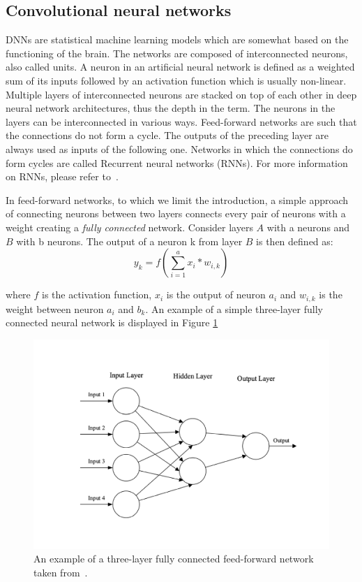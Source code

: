 \subsection{Convolutional neural networks}\label{subsec:convolutional-neural-networks}
DNNs are statistical machine learning models which are somewhat based on the functioning of the brain.
The networks are composed of interconnected neurons, also called units.
A neuron in an artificial neural network is defined as a weighted sum of its inputs followed by an activation function which is usually non-linear.
Multiple layers of interconnected neurons are stacked on top of each other in deep neural network architectures, thus the depth in the term.
The neurons in the layers can be interconnected in various ways.
Feed-forward networks are such that the connections do not form a cycle.
The outputs of the preceding layer are always used as inputs of the following one. 
Networks in which the connections do form cycles are called Recurrent neural networks (RNNs). 
For more information on RNNs, please refer to~\cite{reccurent-neural-networks}.

In feed-forward networks, to which we limit the introduction, a simple approach of connecting neurons between two layers connects every pair of neurons with a weight creating a \textit{fully connected} network. 
Consider layers $A$ with a neurons and $B$ with b neurons.
The output of a neuron k from layer $B$ is then defined as:
\begin{equation}
    y_k=f(\sum_{i=1}^{a}x_i*w_{i,k})
\end{equation}

where $f$ is the activation function, $x_i$ is the output of neuron $a_i$ and $w_{i, k}$ is the weight between neuron $a_i$ and $b_k$. An example of a simple three-layer fully connected neural network is displayed in Figure \ref{fig:simple-net}
\begin{figure}[!htpb]
\centering
   \includegraphics[width=0.8\linewidth]{img/ch2/simple-net}
   \caption[Feed-forward network example]{An example of a three-layer fully connected feed-forward network taken from~\cite{conv-intro}.}
    \label{fig:simple-net}
\end{figure}

